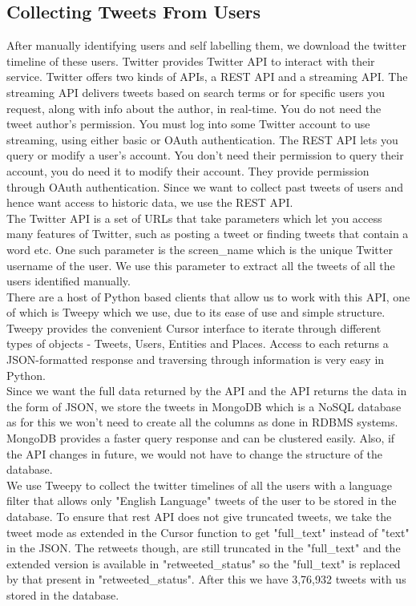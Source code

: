\documentclass[a4paper,11pt]{article}
\begin{document}
\subsection{Collecting Tweets From Users}
After manually identifying users and self labelling them, we download the twitter timeline of these users. Twitter provides Twitter API to interact with their service. Twitter offers two kinds of APIs, a REST API and a streaming API. The streaming API delivers tweets based on search terms or for specific users you request, along with info about the author, in real-time. You do not need the tweet author's permission. You must log into some Twitter account to use streaming, using either basic or OAuth authentication. The REST API lets you query or modify a user's account. You don't need their permission to query their account, you do need it to modify their account. They provide permission through OAuth authentication. Since we want to collect past tweets of users and hence want access to historic data, we use the REST API.
\medskip\\
The Twitter API is a set of URLs that take parameters which let you access many features of Twitter, such as posting a tweet or finding tweets that contain a word etc. One such parameter is the screen\_name which is the unique Twitter username of the user. We use this parameter to extract all the tweets of all the users identified manually.  
\medskip\\
There are a host of Python based clients that allow us to work with this API, one of which is Tweepy which we use, due to its ease of use and simple structure. Tweepy provides the convenient Cursor interface to iterate through different types of objects - Tweets, Users, Entities and Places. Access to each returns a JSON-formatted response and traversing through information is very easy in Python. 
\medskip\\
Since we want the full data returned by the API and the API returns the data in the form of JSON, we store the tweets in MongoDB which is a NoSQL database as for this we won’t need to create all the columns as done in RDBMS systems. MongoDB provides a faster query response and can be clustered easily. Also, if the API changes in future, we would not have to change the structure of the database.
\medskip\\
We use Tweepy to collect the twitter timelines of all the users with a language filter that allows only "English Language" tweets of the user to be stored in the database. To ensure that rest API does not give truncated tweets, we take the tweet mode as extended in the Cursor function to get "full\_text" instead of "text" in the JSON. The retweets though, are still truncated in the "full\_text" and the extended version is available in "retweeted\_status" so the "full\_text" is replaced by that present in "retweeted\_status". After this we have 3,76,932 tweets with us stored in the database.
\vspace*{5mm}
\end{document}
